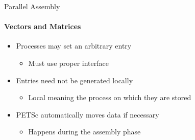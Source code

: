 \begin{frame}{Parallel Assembly}
\framesubtitle{Vectors and Matrices}

\begin{itemize}
  \item Processes may set an arbitrary entry
  \begin{itemize}
    \item Must use proper interface
  \end{itemize}

  \item Entries need not be generated locally
  \begin{itemize}
    \item Local meaning the process on which they are stored
  \end{itemize}

  \item PETSc automatically moves data if necessary
  \begin{itemize}
    \item Happens during the assembly phase
  \end{itemize}
\end{itemize}

\end{frame}
